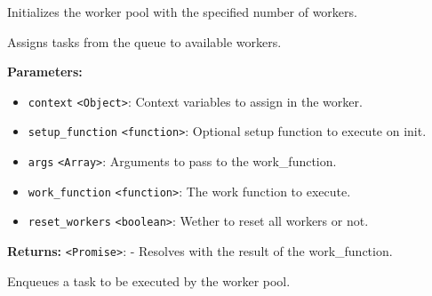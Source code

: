 \documentclass[12pt,a4paper]{article}
\begin{document}
\noindent Initializes the worker pool with the specified number of workers.

\vspace{5mm}
\noindent {}


\noindent Assigns tasks from the queue to available workers.

\vspace{5mm}
\noindent {}


\noindent \textbf{Parameters:}
\begin{itemize}
  \item \texttt{context} \texttt{<Object>}: Context variables to assign in the worker.
  \item \texttt{setup\_function} \texttt{<function>}: Optional setup function to execute on init.
  \item \texttt{args} \texttt{<Array>}: Arguments to pass to the work\_function.
  \item \texttt{work\_function} \texttt{<function>}: The work function to execute.
  \item \texttt{reset\_workers} \texttt{<boolean>}: Wether to reset all workers or not.
\end{itemize}

\noindent \textbf{Returns:} \texttt{<Promise>}: - Resolves with the result of the work\_function.

\noindent Enqueues a task to be executed by the worker pool.

\vspace{5mm}
\noindent {}
\end{document}
